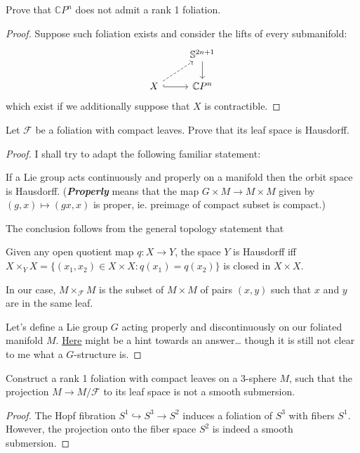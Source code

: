 \documentclass{article}
\newcommand{\C}{\mathbb{C}}
\newcommand{\Fc}{\mathcal{F}}
\renewcommand{\S}{\mathbb{S}}
\begin{document}
\begin{exercise}
	Prove that $\C P^n$ does not admit a rank 1 foliation.
\end{exercise}
\begin{proof}
	Suppose such foliation exists and consider the lifts of every submanifold:
	\[\begin{tikzcd}
		&\S^{2n+1}\arrow[d]\\
		X\arrow[r,hook]\arrow[ur,dashed]&\C P^n
	\end{tikzcd}\]
	which exist if we additionally suppose that $X$ is contractible.
\end{proof}
\begin{exercise}
	Let $\Fc$ be a foliation with compact leaves. Prove that its leaf space is Hausdorff.
\end{exercise}
\begin{proof}
	I shall try to adapt the following familiar statement:
	\begin{prop}
		If a Lie group acts continuously and properly on a manifold then the orbit space is Hausdorff. (\textbf{\textit{Properly}} means that the map $G\times M\to M\times M$ given by $(g,x)\mapsto (gx,x)$ is proper, ie. preimage of compact subset is compact.)
	\end{prop}
	
	The conclusion follows from the general topology statement that 
	\begin{prop}
		Given any open quotient map $q:X\to Y$, the space $Y$ is Hausdorff iff $X\times_YX=\{(x_1,x_2)\in X\times X:q(x_1)=q(x_2)\}$ is closed in $X\times X$.
	\end{prop}
	In our case, $M\times_{\Fc}M$ is the subset of $M\times M$ of pairs $(x,y)$ such that $x$ and $y$ are in the same leaf.
	
	Let's define a Lie group $G$ acting properly and discontinuously on our foliated manifold $M$. \href{https://math.stackexchange.com/questions/3576222/a-foliations-as-a-g-stucture}{Here} might be a hint towards an answer… though it is still not clear to me what a $G$-structure is.
\end{proof}
\begin{exercise}
	Construct a rank 1 foliation with compact leaves on a 3-sphere $M$, such that the projection $M\to M/\Fc$ to its leaf space is not a smooth submersion.
\end{exercise}
\begin{proof}
	The Hopf fibration $S^1\hookrightarrow S^3\to S^2$ induces a foliation of $S^3$ with fibers $S^1$. However, the projection onto the fiber space $S^2$ is indeed a smooth submersion.
\end{proof}
\end{document}
